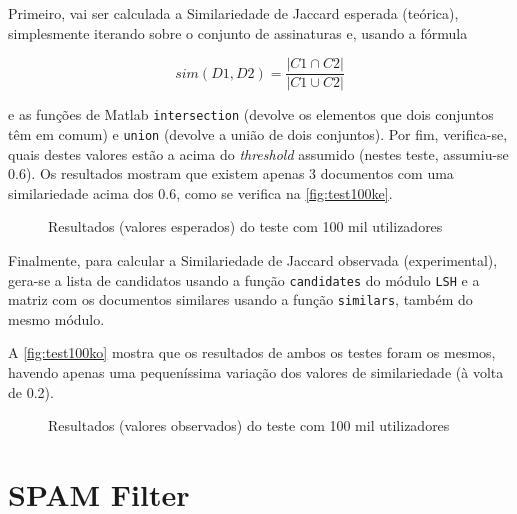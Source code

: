 \documentclass[a4paper,11pt,openright,oneside]{report}
\begin{document}
Primeiro, vai ser calculada a Similariedade de Jaccard esperada (teórica), simplesmente iterando sobre o conjunto de assinaturas e, usando a fórmula 

$$ sim(D1, D2) = \frac{|C1\cap C2|}{|C1\cup C2|} $$

e as funções de Matlab \texttt{intersection} (devolve os elementos que dois conjuntos têm em comum) e \texttt{union} (devolve a união de dois conjuntos). Por fim, verifica-se, quais destes valores estão a acima do \textit{threshold} assumido (nestes teste, assumiu-se 0.6). Os resultados mostram que existem apenas 3 documentos com uma similariedade acima dos 0.6, como se verifica na \autoref{fig:test100ke}.

\begin{figure}[ht]	
\center
{}
\caption{Resultados (valores esperados) do teste com 100 mil utilizadores}
\label{fig:test100ke}
\end{figure}

Finalmente, para calcular a Similariedade de Jaccard observada (experimental), gera-se a lista de candidatos usando a função \texttt{candidates} do módulo \texttt{LSH} e a matriz com os documentos similares usando a função \texttt{similars}, também do mesmo módulo.

A \autoref{fig:test100ko} mostra que os resultados de ambos os testes foram os mesmos, havendo apenas uma pequeníssima variação dos valores de similariedade (à volta de 0.2).

\begin{figure}[ht]	
\center
{}
\caption{Resultados (valores observados) do teste com 100 mil utilizadores}
\label{fig:test100ko}
\end{figure}


\chapter{SPAM Filter}
\label{chap.spamfilter}
\end{document}
